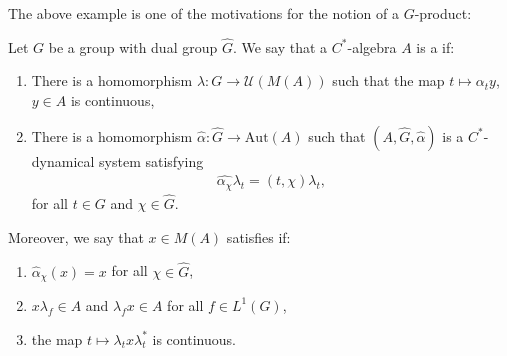The above example is one of the motivations for the notion of a $G$-product:
\begin{definition}
	Let $G$ be a group with dual group $\hat G$. We say that a $C^*$-algebra $A$ is a  if:
	\begin{enumerate}
		\item There is a homomorphism $\lambda \colon G \to \mathcal{U}(M(A))$ such that the map $t \mapsto \alpha_t y$, $y \in A$ is continuous,
		\item There is a homomorphism $\hat \alpha \colon \hat G \to \mathrm{Aut}(A)$ such that $(A, \hat G, \hat \alpha )$ is a $C^*$-dynamical system satisfying
			\begin{align*}
				\hat{\alpha_\chi} \lambda_t = (t,\chi) \lambda_t,
			\end{align*}
			for all $t \in G$ and $\chi \in \hat G$.
	\end{enumerate}
	Moreover, we say that $x \in M(A)$ satisfies  if:
	\begin{enumerate}
		\item $\hat \alpha_{\chi}(x) = x$ for all $\chi \in \hat G$,
		\item $ x \lambda_f \in A$ and $\lambda_f x \in A$ for all $f \in L^1(G)$,
		\item the map $t \mapsto \lambda_t x \lambda_{t}^*$ is continuous.
	\end{enumerate}
\end{definition}


